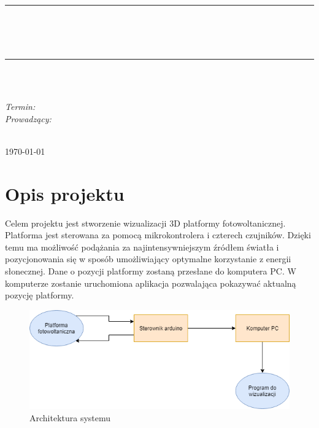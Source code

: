 \documentclass[10pt, a4paper]{article}
\begin{document}
\def\tablename{Tabela}	%

\begin{titlepage}
	\begin{center}
		\textsc{\LARGE \formakursu}\\[1cm]		
		\textsc{\Large \kurs}\\[0.5cm]		
		\rule{\textwidth}{0.08cm}\\[0.4cm]
		{\huge \bfseries \doctype}\\[1cm]
		{\huge \bfseries \projectname}\\[0.5cm]
		\rule{\textwidth}{0.08cm}\\[1cm]
		
		\begin{flushright} \large
		\osobaA\\[0.4cm]
		
		\emph{Termin: }\termin\\[0.4cm]

		\emph{Prowadzący:} \\
		\prowadzacy \\
		
		\end{flushright}
		
		\vfill
		
		{\large \today}
	\end{center}	
\end{titlepage}

\newpage
\tableofcontents
\newpage

\section{Opis projektu}
\label{sec:OpisProjektu}

Celem projektu jest stworzenie wizualizacji 3D platformy fotowoltanicznej. Platforma jest sterowana za pomocą mikrokontrolera i czterech czujników. Dzięki temu ma możliwość podążania za najintensywniejszym źródłem światła i pozycjonowania się w sposób umożliwiający optymalne korzystanie z energii słonecznej. Dane o pozycji platformy zostaną przesłane do komputera PC. W komputerze zostanie uruchomiona aplikacja pozwalająca pokazywać aktualną pozycję platformy.
\newline
\newline

\begin{figure}[H]
	\centering
	\includegraphics[width=1\textwidth]{figures/diag_uml.png}
	\caption{Architektura systemu}
	\label{fig:Architektura}
\end{figure}
\end{document}
